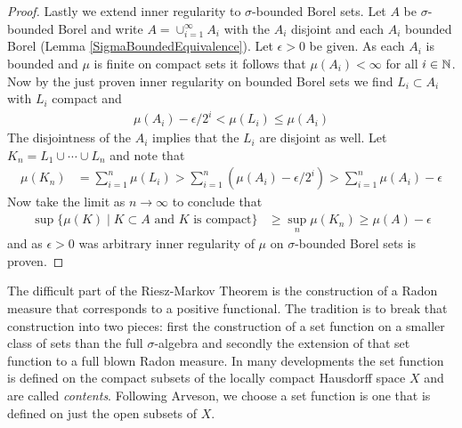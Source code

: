 \begin{proof}
Lastly we extend inner regularity to
$\sigma$-bounded Borel sets.  Let $A$ be $\sigma$-bounded Borel and
write $A = \cup_{i=1}^\infty A_i$ with the $A_i$ disjoint and each
$A_i$ bounded Borel (Lemma \ref{SigmaBoundedEquivalence}).  Let
$\epsilon > 0$ be given.  As each
$A_i$ is bounded and $\mu$ is finite on compact sets it follows that
$\mu(A_i) < \infty$ for all $i \in \mathbb{N}$.  Now by the just proven
inner regularity on bounded Borel sets we find $L_i \subset A_i$ with
$L_i$ compact and
\begin{align*}
\mu(A_i) - \epsilon/2^i < \mu(L_i) \leq \mu(A_i)
\end{align*}
The disjointness of the $A_i$ implies that the $L_i$ are disjoint as well.
Let $K_n = L_1 \cup \dotsb \cup L_n$ and note that
\begin{align*}
\mu(K_n) &= \sum_{i=1}^n \mu(L_i) > \sum_{i=1}^n \left( \mu(A_i) -
\epsilon/2^i \right ) > \sum_{i=1}^n \mu(A_i) - \epsilon
\end{align*}
Now take the limit as $n \to \infty$ to conclude that 
\begin{align*}
\sup \lbrace \mu(K) \mid K \subset A \text{ and $K$ is compact}
\rbrace &\geq \sup_n \mu(K_n) \geq \mu(A) - \epsilon
\end{align*}
and as $\epsilon > 0$ was arbitrary inner regularity of $\mu$ on
$\sigma$-bounded Borel sets is proven.
\end{proof}

The difficult part of the Riesz-Markov Theorem is the construction of
a Radon measure that corresponds to a positive functional.  The
tradition is to break that construction into two pieces: first the
construction of a set function on a smaller class of sets than the
full $\sigma$-algebra  and secondly the extension of that set function
to a full blown Radon measure. In many developments the set function
is defined on the compact subsets of the  locally compact
Hausdorff space $X$ and are called \emph{contents}.  Following
Arveson, we choose a set function is one
that is defined on just the open subsets of $X$.


